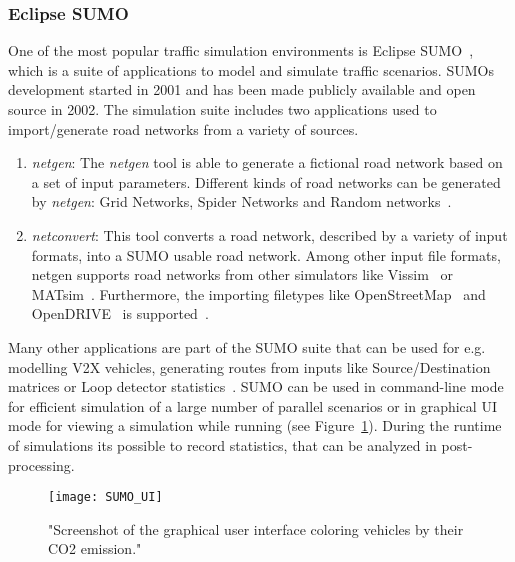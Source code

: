             \subsubsection{Eclipse SUMO}
                One of the most popular traffic simulation environments is Eclipse SUMO~\cite{Behrisch2011SUMOS}, which is a suite of applications to model and simulate traffic scenarios.
                SUMOs development started in 2001 and has been made publicly available and open source in 2002.
                The simulation suite includes two applications used to import/generate road networks from a variety of sources.
                \begin{enumerate}
                    \item \textit{netgen}: The \textit{netgen} tool is able to generate a fictional road network based on a set of input parameters.
                        Different kinds of road networks can be generated by \textit{netgen}: Grid Networks, Spider Networks and Random networks~\cite{SUMOWebsite}.
                    \item \textit{netconvert}: This tool converts a road network, described by a variety of input formats, into a SUMO usable road network.
                        Among other input file formats, netgen supports road networks from other simulators like Vissim~\cite{lownes2006vissim} or MATsim~\cite{balmer2009matsim,w2016multi}.
                        Furthermore, the importing filetypes like OpenStreetMap~\cite{haklay2008openstreetmap} and OpenDRIVE~\cite{openDrive} is supported~\cite{Behrisch2011SUMOS}.
                \end{enumerate}
                Many other applications are part of the SUMO suite that can be used for e.g. modelling V2X vehicles, generating routes from inputs like Source/Destination matrices or Loop detector statistics~\cite{Behrisch2011SUMOS}.
                SUMO can be used in command-line mode for efficient simulation of a large number of parallel scenarios or in graphical UI mode for viewing a simulation while running (see Figure~\ref{fig:sumo-UI}).
                During the runtime of simulations its possible to record statistics, that can be analyzed in post-processing.

                \begin{figure}[H]
                    \centering
                    \texttt{[image: SUMO\_UI]}
                    \caption{"Screenshot of the graphical user interface coloring vehicles by
                    their CO2 emission."\cite{Behrisch2011SUMOS}}
                    \label{fig:sumo-UI}
                \end{figure}
